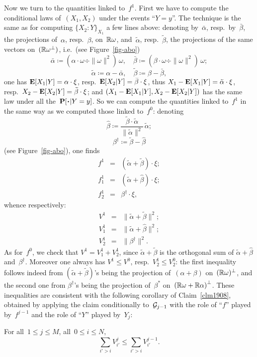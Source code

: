 Now we turn to the quantities linked to~$f^1$.
First we have to compute the conditional laws of~$(X_1,X_2)$
under the events ``$Y=y$''.
%
The technique is the same as for computing $\{X_2:Y\}_{X_1}$
a few lines above:
denoting by~$\bar{\alpha}$, resp.\ by~$\bar{\beta}$, the projections of~$\alpha$, resp.~$\beta$, on~$\mathbb{R}\omega$,
and~$\tilde{\alpha}$, resp.~$\tilde{\beta}$, the projections of the same vectors on~$(\mathbb{R}\omega^\perp)$, i.e.\ (see Figure~\ref{fig-abo})
\[ \bar{\alpha} \coloneqq (\alpha\cdot\omega \div \|\omega\|^2)\,\omega , \quad
\bar{\beta} \coloneqq (\beta\cdot\omega \div \|\omega\|^2) \,\omega ; \]
\[ \tilde{\alpha} \coloneqq \alpha - \bar{\alpha} , \quad
\tilde{\beta} \coloneqq \beta - \bar{\beta} ,\]
%
one has $\EE[X_1|Y] = \bar{\alpha}\cdot\xi$,
resp.\ $\EE[X_2|Y] = \bar{\beta}\cdot\xi$, thus
$X_1 - \EE[X_1|Y] = \tilde{\alpha}\cdot\xi$,
resp.\ $X_2 - \EE[X_2|Y] = \tilde{\beta}\cdot\xi$;
and $(X_1 - \mathop{\smash{\mathbf{E}}}\nolimits[X_1|Y], X_2 - \mathop{\smash{\mathbf{E}}}\nolimits[X_2|Y])$
has the same law under all the~$\Pr[\Bcdot|Y=y]$.
%
So we can compute the quantities linked to~$f^1$ in the same way
as we computed those linked to~$f^0$: denoting
\[ \hat{\beta} \coloneqq \frac{\tilde{\beta} \cdot \tilde{\alpha}}{\|\tilde{\alpha}\|^2} \, \tilde{\alpha} ; \]
\[\beta^\dag \coloneqq \tilde{\beta} - \hat{\beta} \]
(see Figure~\ref{fig-abo}), one finds
%
\begin{eqnarray}
f^1 &=& (\tilde{\alpha}+\tilde{\beta})\cdot\xi ;\\
f_1^1 &=& (\tilde{\alpha}+\hat{\beta})\cdot\xi ;\\
f_2^1 &=& \beta^\dag \cdot \xi ,
\end{eqnarray}
whence respectively:
\begin{eqnarray}
V^1 &=& \| \tilde{\alpha} + \tilde{\beta} \|^2 ;\\
V_1^1 &=& \|\tilde{\alpha}+\hat{\beta}\|^2 ;\\
V_2^1 &=& \|\beta^\dag\|^2.
\end{eqnarray}
%
As for~$f^0$, we check that $V^1 = V_1^1 + V_2^1$,
since $\tilde{\alpha} + \tilde{\beta}$ is the orthogonal sum of
$\tilde{\alpha} + \hat{\beta}$ and~$\beta^\dag$.
Moreover one always has $V^1 \leq V^0$, resp.\ $V_2^1 \leq V_2^0$:
the first inequality follows indeed from ${(\tilde{\alpha} + \tilde{\beta})}$'s being
the projection of~${(\alpha + \beta)}$ on~$(\mathbb{R}\omega)^\perp$,
and the second one from $\beta^\dag$'s being
the projection of~$\beta^*$ on~${(\mathbb{R}\omega+\mathbb{R}\alpha)}^\perp$.
%
These inequalities are consistent with the following corollary of Claim~\ref{clm1908},
obtained by applying the claim conditionally to~$\mathcal{G}_{j-1}$
with the role of ``$f$'' played by~$f^{j-1}$ and the role of ``$Y$'' played by~$Y_j$:
%
\begin{Pro}\label{clm3701}
For all~$1\leq j\leq M$, all~$0\leq i\leq N$,
\[ \sum_{i'>i} V_{i'}^j \leq \sum_{i'>i} V_{i'}^{j-1} .\]
\end{Pro}


